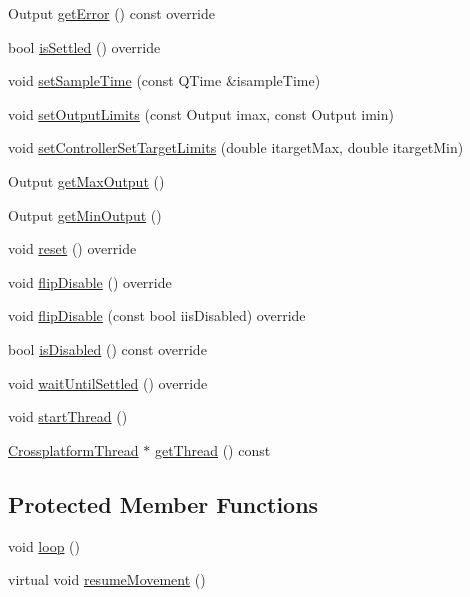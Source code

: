 \begin{DoxyCompactItemize}
\item 
Output \mbox{\hyperlink{classokapi_1_1AsyncWrapper_a64b690883ff7475375a6d08ad3fb62f9}{get\+Error}} () const override
\item 
bool \mbox{\hyperlink{classokapi_1_1AsyncWrapper_a93343937a8bbe762aeb6460197a22dfe}{is\+Settled}} () override
\item 
void \mbox{\hyperlink{classokapi_1_1AsyncWrapper_afe14fb6e7727c313bd40cf74d28f0a14}{set\+Sample\+Time}} (const Q\+Time \&isample\+Time)
\item 
void \mbox{\hyperlink{classokapi_1_1AsyncWrapper_a668c83b4a2b5bee7f2d072b57157d19a}{set\+Output\+Limits}} (const Output imax, const Output imin)
\item 
void \mbox{\hyperlink{classokapi_1_1AsyncWrapper_a9cb3a50a27e7d3e1263ed3aa6c57bb82}{set\+Controller\+Set\+Target\+Limits}} (double itarget\+Max, double itarget\+Min)
\item 
Output \mbox{\hyperlink{classokapi_1_1AsyncWrapper_a95112bac1792ef04010cd97efa135998}{get\+Max\+Output}} ()
\item 
Output \mbox{\hyperlink{classokapi_1_1AsyncWrapper_a41ccefbf1da06cca1ec525d0ad80fa00}{get\+Min\+Output}} ()
\item 
void \mbox{\hyperlink{classokapi_1_1AsyncWrapper_a9372a74580e5be429ecd65ec0e110c23}{reset}} () override
\item 
void \mbox{\hyperlink{classokapi_1_1AsyncWrapper_afdf4d80b0f3eec3d77280a561b24f0b0}{flip\+Disable}} () override
\item 
void \mbox{\hyperlink{classokapi_1_1AsyncWrapper_ab47f9a7ee52a5d699cb39b21b0926981}{flip\+Disable}} (const bool iis\+Disabled) override
\item 
bool \mbox{\hyperlink{classokapi_1_1AsyncWrapper_a83d411851373f0483b5ae392560a180a}{is\+Disabled}} () const override
\item 
void \mbox{\hyperlink{classokapi_1_1AsyncWrapper_a23435c257ac2d6df59ab5d96408e608a}{wait\+Until\+Settled}} () override
\item 
void \mbox{\hyperlink{classokapi_1_1AsyncWrapper_a5225a6b4748da30bf17ddbda692cbf4a}{start\+Thread}} ()
\item 
\mbox{\hyperlink{classCrossplatformThread}{Crossplatform\+Thread}} $\ast$ \mbox{\hyperlink{classokapi_1_1AsyncWrapper_aef499c3f854e809951f6fa4f2d3ff40e}{get\+Thread}} () const
\end{DoxyCompactItemize}
\subsection*{Protected Member Functions}
\begin{DoxyCompactItemize}
\item 
void \mbox{\hyperlink{classokapi_1_1AsyncWrapper_aebaec0e97543204889293256ba7bec4a}{loop}} ()
\item 
virtual void \mbox{\hyperlink{classokapi_1_1AsyncWrapper_a67fa1bf10df9b8f3c280d8f2b136038a}{resume\+Movement}} ()
\end{DoxyCompactItemize}

